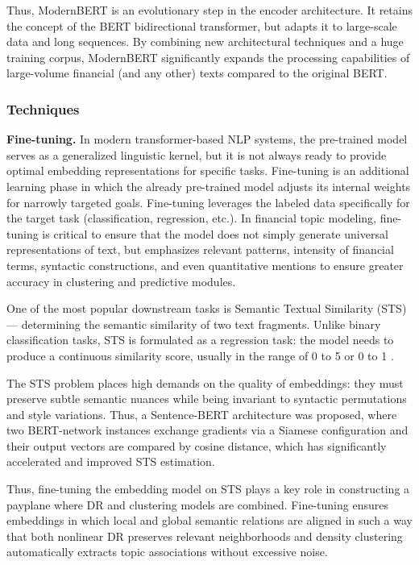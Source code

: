 Thus, ModernBERT is an evolutionary step in the encoder architecture. It retains the concept of the BERT
bidirectional transformer, but adapts it to large-scale data and long sequences. By combining new architectural
techniques and a huge training corpus, ModernBERT significantly expands the processing capabilities
of large-volume financial (and any other) texts compared to the original BERT.

\subsubsection{Techniques}
\textbf{Fine-tuning.} In modern transformer-based NLP systems, the pre-trained model serves
as a generalized linguistic kernel, but it is not always ready to provide optimal embedding
representations for specific tasks. Fine-tuning is an additional learning phase in which
the already pre-trained model adjusts its internal weights for narrowly targeted goals.
Fine-tuning leverages the labeled data specifically for the target task (classification,
regression, etc.). In financial topic modeling, fine-tuning is critical to ensure that
the model does not simply generate universal representations of text, but emphasizes
relevant patterns, intensity of financial terms, syntactic constructions, and even
quantitative mentions to ensure greater accuracy in clustering and predictive modules.

One of the most popular downstream tasks is Semantic Textual Similarity (STS) ---
determining the semantic similarity of two text fragments. Unlike binary classification
tasks, STS is formulated as a regression task: the model needs to produce a continuous
similarity score, usually in the range of 0 to 5 \parencite{Cer2017STSB} or 0 to 1
\parencite{gao2021simcse}.

The STS problem places high demands on the quality of embeddings: they must preserve
subtle semantic nuances while being invariant to syntactic permutations and style
variations. Thus, a Sentence-BERT architecture was proposed, where two BERT-network
instances exchange gradients via a Siamese configuration and their output vectors are
compared by cosine distance, which has significantly accelerated and improved STS
\parencite{SBERT2019} estimation.

Thus, fine-tuning the embedding model on STS plays a key role in constructing a payplane
where DR and clustering models are combined. Fine-tuning ensures
embeddings in which local and global semantic relations are aligned in such a way that
both nonlinear DR preserves relevant neighborhoods and density
clustering automatically extracts topic associations without excessive noise.

